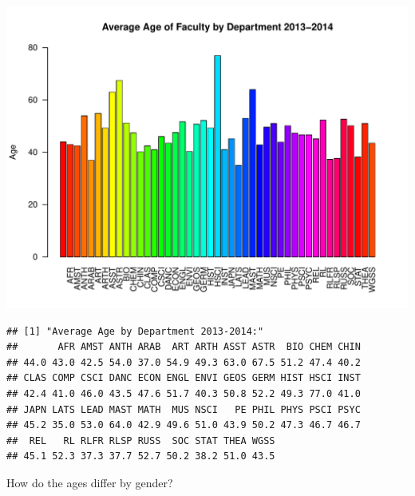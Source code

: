 \documentclass[12pt,a4paper]{article}\usepackage[]{graphicx}\usepackage[]{color}
\makeatletter
\def\maxwidth{ %
  \ifdim\Gin@nat@width>\linewidth
    \linewidth
  \else
    \Gin@nat@width
  \fi
}
\newenvironment{kframe}{%
 \def\at@end@of@kframe{}%
 \ifinner\ifhmode%
  \def\at@end@of@kframe{\end{minipage}}%
  \begin{minipage}{\columnwidth}%
 \fi\fi%
 \def\FrameCommand##1{\hskip\@totalleftmargin \hskip-\fboxsep
 \colorbox{shadecolor}{##1}\hskip-\fboxsep
     \hskip-\linewidth \hskip-\@totalleftmargin \hskip\columnwidth}%
 \MakeFramed {\advance\hsize-\width
   \@totalleftmargin\z@ \linewidth\hsize
   \@setminipage}}%
 {\par\unskip\endMakeFramed%
 \at@end@of@kframe}
\newenvironment{knitrout}{}{} %
\theoremstyle{definition}
\makeatother
\begin{document}
\begin{knitrout}
\includegraphics[width=\maxwidth]{figure/unnamed-chunk-10-10} 
\begin{kframe}\begin{verbatim}
## [1] "Average Age by Department 2013-2014:"
##       AFR AMST ANTH ARAB  ART ARTH ASST ASTR  BIO CHEM CHIN 
## 44.0 43.0 42.5 54.0 37.0 54.9 49.3 63.0 67.5 51.2 47.4 40.2 
## CLAS COMP CSCI DANC ECON ENGL ENVI GEOS GERM HIST HSCI INST 
## 42.4 41.0 46.0 43.5 47.6 51.7 40.3 50.8 52.2 49.3 77.0 41.0 
## JAPN LATS LEAD MAST MATH  MUS NSCI   PE PHIL PHYS PSCI PSYC 
## 45.2 35.0 53.0 64.0 42.9 49.6 51.0 43.9 50.2 47.3 46.7 46.7 
##  REL   RL RLFR RLSP RUSS  SOC STAT THEA WGSS 
## 45.1 52.3 37.3 37.7 52.7 50.2 38.2 51.0 43.5
\end{verbatim}
\end{kframe}
\end{knitrout}

\bigskip
How do the ages differ by gender?
\end{document}
